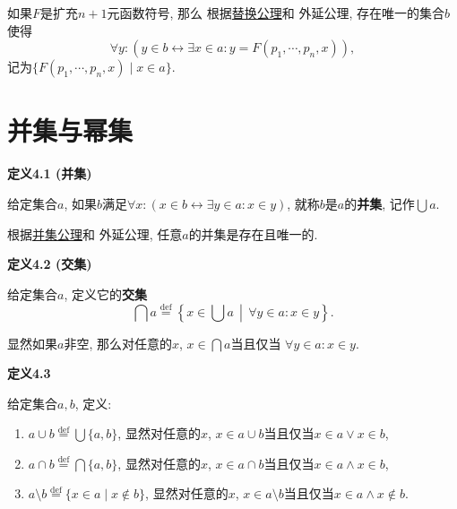 \documentclass[UTF8]{ctexart}
\begin{document}
如果$F$是扩充$n+1$元函数符号, 那么
根据\href{../01 ZFC 公理/01 ZFC 公理#nameddest=sec:替换公理模式}{替换公理}和
外延公理, 存在唯一的集合$b$使得
\[
    \forall y:(y\in b\leftrightarrow\exists x\in a:y=F(p_1,\cdots,p_n,x)),
\]
记为$\{F(p_1,\cdots,p_n,x)\mid x\in a\}$.





\vspace{20pt}

\section{并集与幂集}

\hypertarget{sec:定义4.1}{}
\noindent\textbf{定义4.1 (并集)}

给定集合$a$, 如果$b$满足$\forall x:(x\in b\leftrightarrow\exists y\in a:x\in y)$,
就称$b$是$a$的\textbf{并集}, 记作$\displaystyle\bigcup a$.

根据\href{../01 ZFC 公理/01 ZFC 公理#nameddest=sec:并集公理}{并集公理}和
外延公理, 任意$a$的并集是存在且唯一的.

\vspace{10pt}

\hypertarget{sec:定义4.2}{}
\noindent\textbf{定义4.2 (交集)}

给定集合$a$, 定义它的\textbf{交集}
\[
    \bigcap a\overset{\mathrm{def}}{=}\left\{x\in\bigcup a\,\middle\vert\,
    \forall y\in a:x\in y\right\}.
\]

\vspace{10pt}

显然如果$a$非空, 那么对任意的$x$, $\displaystyle x\in\bigcap a$当且仅当
$\forall y\in a:x\in y$.

\vspace{10pt}

\hypertarget{sec:定义4.3}{}
\noindent\textbf{定义4.3}

给定集合$a,b$, 定义:
\begin{enumerate}
    \item $\displaystyle a\cup b\overset{\mathrm{def}}{=}\bigcup\{a,b\}$,
    显然对任意的$x$, $x\in a\cup b$当且仅当$x\in a\lor x\in b$,
    \item $\displaystyle a\cap b\overset{\mathrm{def}}{=}\bigcap\{a,b\}$,
    显然对任意的$x$, $x\in a\cap b$当且仅当$x\in a\land x\in b$,
    \item $\displaystyle a\setminus b\overset{\mathrm{def}}{=}
    \{x\in a\mid x\notin b\}$,
    显然对任意的$x$, $x\in a\setminus b$当且仅当$x\in a\land x\notin b$.
\end{enumerate}
\end{document}

